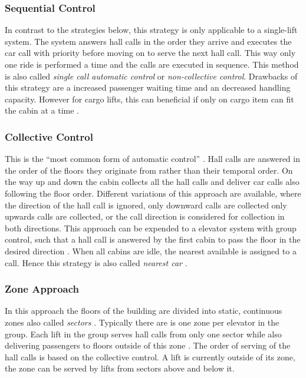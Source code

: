 \subsubsection{Sequential Control}
In contrast to the strategies below, 
this strategy is only applicable to a single-lift system.
The system answers hall calls in the order they arrive 
and executes the car call with priority before moving on to serve the next hall call.
This way only one ride is performed a time and the calls are executed in sequence. This method is also called \emph{single call automatic control} or \emph{non-collective control}.
Drawbacks of this strategy are a increased passenger waiting time and an decreased handling capacity.
However for cargo lifts, this can beneficial if only on cargo item can fit the cabin at a time
\autocite[][p.~238]{barney2016handbook}.

\subsubsection{Collective Control}
This is the \enquote{most common form of automatic control} \autocite[][p.~237]{barney2016handbook}.
Hall calls are answered in the order of the floors they originate from rather than their temporal order.
On the way up and down the cabin collects all the hall calls and deliver car calls also following the floor order.
Different variations of this approach are available, where the direction of the hall call is ignored, only downward calls are collected only upwards calls are collected, or the call direction is considered for collection in both directions.
This approach can be expended to a elevator system with group control, such that a hall call is answered by the first cabin to pass the floor in the desired direction \autocite[][p.~238]{barney2016handbook}.
When all cabins are idle, the nearest available is assigned to a call. Hence this strategy is also called \emph{nearest car}
\autocite[][p.~244]{barney2016handbook}.

\subsubsection{Zone Approach}
In this approach the floors of the building are divided into static, continuous zones also called \emph{sectors} \autocite[][p.~247]{barney2016handbook}. 
Typically there are is one zone per elevator in the group. 
Each lift in the group serves hall calls from only one sector
while also delivering passengers to floors outside of this zone
\autocite[][pp.~3--6]{axelsson2013strategies}.
The order of serving of the hall calls is based on the collective control.
A lift is currently outside of its zone, 
the zone can be served by lifts from sectors above and below it.

